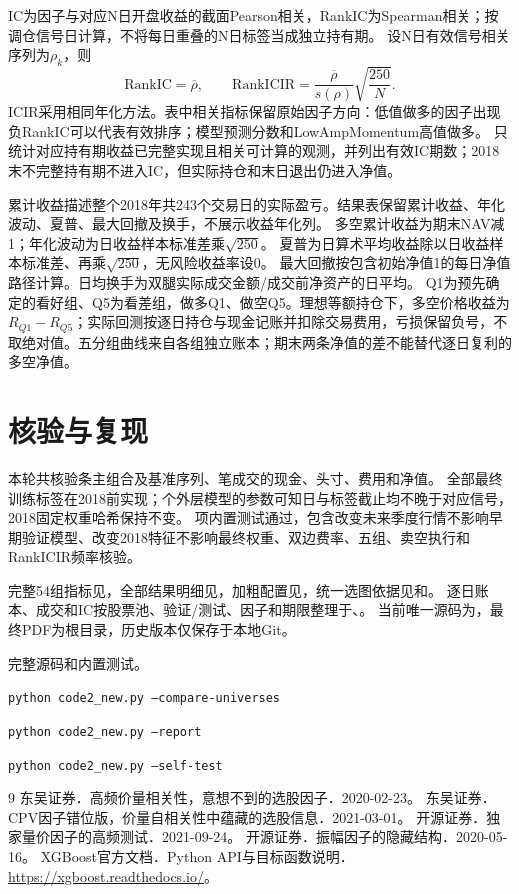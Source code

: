 \documentclass[10pt,compsoc,UTF8]{CjC}
\begin{document}
IC为因子与对应N日开盘收益的截面Pearson相关，RankIC为Spearman相关；按调仓信号日计算，不将每日重叠的N日标签当成独立持有期。
设N日有效信号相关序列为$\rho_k$，则
\[
\mathrm{RankIC}=\overline{\rho},\qquad
\mathrm{RankICIR}=\frac{\overline{\rho}}{s(\rho)}\sqrt{\frac{250}{N}}.
\]
ICIR采用相同年化方法。表中相关指标保留原始因子方向：低值做多的因子出现负RankIC可以代表有效排序；模型预测分数和LowAmpMomentum高值做多。
只统计对应持有期收益已完整实现且相关可计算的观测，并列出有效IC期数；2018末不完整持有期不进入IC，但实际持仓和末日退出仍进入净值。

累计收益描述整个2018年共243个交易日的实际盈亏。结果表保留累计收益、年化波动、夏普、最大回撤及换手，不展示收益年化列。
多空累计收益为期末NAV减1；年化波动为日收益样本标准差乘$\sqrt{250}$。
夏普为日算术平均收益除以日收益样本标准差、再乘$\sqrt{250}$，无风险收益率设0。
最大回撤按包含初始净值1的每日净值路径计算。日均换手为双腿实际成交金额/成交前净资产的日平均。
Q1为预先确定的看好组、Q5为看差组，做多Q1、做空Q5。理想等额持仓下，多空价格收益为$R_{Q1}-R_{Q5}$；实际回测按逐日持仓与现金记账并扣除交易费用，亏损保留负号，不取绝对值。五分组曲线来自各组独立账本；期末两条净值的差不能替代逐日复利的多空净值。



\clearpage
\section{核验与复现}
本轮共核验\Series 条主组合及基准序列、\Trades 笔成交的现金、头寸、费用和净值。
全部最终训练标签在2018前实现；\ValidationModels 个外层模型的参数可知日与标签截止均不晚于对应信号，2018固定权重哈希保持不变。
\Tests 项内置测试通过，包含改变未来季度行情不影响早期验证模型、改变2018特征不影响最终权重、双边费率、五组、卖空执行和RankICIR频率核验。

完整54组指标见，全部结果明细见，加粗配置见，统一选图依据见和。
逐日账本、成交和IC按股票池、验证/测试、因子和期限整理于、。
当前唯一源码为，最终PDF为根目录，历史版本仅保存于本地Git。

\noindent{}\quad 完整源码和内置测试。\par
\texttt{python code2\_new.py --compare-universes}\par
\texttt{python code2\_new.py --report}\par
\texttt{python code2\_new.py --self-test}

\begin{thebibliography}{9}\footnotesize
{} 东吴证券．高频价量相关性，意想不到的选股因子．2020-02-23。
 东吴证券．CPV因子错位版，价量自相关性中蕴藏的选股信息．2021-03-01。
 开源证券．独家量价因子的高频测试．2021-09-24。
 开源证券．振幅因子的隐藏结构．2020-05-16。
 XGBoost官方文档．Python API与目标函数说明．\url{https://xgboost.readthedocs.io/}。
\end{thebibliography}
\end{document}
